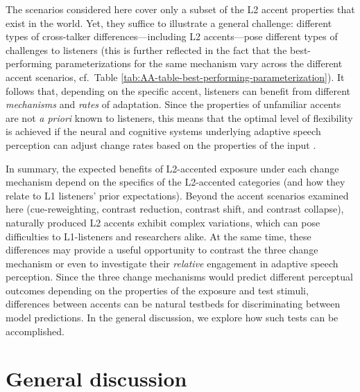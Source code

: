 \documentclass[
  11pt,
  man,floatsintext]{apa6}
\begin{document}
The scenarios considered here cover only a subset of the L2 accent properties that exist in the world. Yet, they suffice to illustrate a general challenge: different types of cross-talker differences---including L2 accents---pose different types of challenges to listeners (this is further reflected in the fact that the best-performing parameterizations for the same mechanism vary across the different accent scenarios, cf.~Table \ref{tab:AA-table-best-performing-parameterization}). It follows that, depending on the specific accent, listeners can benefit from different \emph{mechanisms} and \emph{rates} of adaptation. Since the properties of unfamiliar accents are not \emph{a priori} known to listeners, this means that the optimal level of flexibility is achieved if the neural and cognitive systems underlying adaptive speech perception can adjust change rates based on the properties of the input \autocite[see discussion of the trade-off between flexibility and stability in][pp.~180-182]{kleinschmidt-jaeger2015}.

In summary, the expected benefits of L2-accented exposure under each change mechanism depend on the specifics of the L2-accented categories (and how they relate to L1 listeners' prior expectations). Beyond the accent scenarios examined here (cue-reweighting, contrast reduction, contrast shift, and contrast collapse), naturally produced L2 accents exhibit complex variations, which can pose difficulties to L1-listeners and researchers alike. At the same time, these differences may provide a useful opportunity to contrast the three change mechanism or even to investigate their \emph{relative} engagement in adaptive speech perception. Since the three change mechanisms would predict different perceptual outcomes depending on the properties of the exposure and test stimuli, differences between accents can be natural testbeds for discriminating between model predictions. In the general discussion, we explore how such tests can be accomplished.

\hypertarget{sec:general-discussion}{%
\section{General discussion}\label{sec:general-discussion}}
\end{document}
